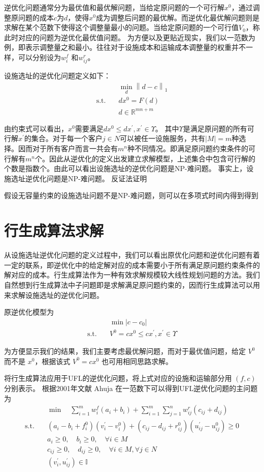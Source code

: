 \documentclass[UTF8]{article}
\begin{document}
逆优化问题通常分为最优值和最优解问题，当给定原问题的一个可行解$x^0$，通过调整原问题的成本$c$为$d$，使得$x^0$成为调整后问题的最优解。而逆优化最优解问题则是求解在某个范数下使得这个调整量最小的问题。当给定原问题的一个可行值$V_0$，称此时对应的问题为逆优化最优值问题。
为方便以及更贴近现实，我们以一范数为例，即表示调整量之和最小。往往对于设施成本和运输成本调整量的权重并不一样，可以分别设为$w_i^f$ 和$w_{ij}^r$。

设施选址的逆优化问题定义如下：
\begin{align*}
&\min_{d} \left\|d-c\right\|_1 \\
\text{s.t.}\quad & dx^0 = F(d) \\
& d \in \mathbb{R}^{mn+m}
\end{align*}

由约束式可以看出，$x^0$需要满足$dx^0 \leq dx^{'}, x^{'} \in \Upsilon$。 其中$\Upsilon$是满足原问题的所有可行解$x^{'}$的集合。对于每一个客户$j \in N$可以被任一设施服务，共有$|M|=m$种选择。因而对于所有客户而言一共会有$m^n$种不同情况。即满足原问题约束条件的可行解有$m^n$个。因此从逆优化的定义出发建立求解模型，上述集合中包含可行解的个数是指数个。由此可以看出设施选址的逆优化问题是NP-难问题。
事实上，设施选址逆优化问题是NP-难问题。
反证法证明

假设无容量约束的设施选址问题不是NP-难问题，则可以在多项式时间内得到得到


\section{行生成算法求解}
从设施选址逆优化问题的定义过程中，我们可以看出原优化问题和逆优化问题有着一定的联系，即逆优化中的给定解对应的成本需要小于所有满足原问题约束条件的解对应的成本。行生成算法作为一种有效求解规模较大线性规划问题的方法。我们自然想到行生成算法中子问题即是求解满足原问题约束的，因而行生成算法可以用来求解设施选址的逆优化问题。

原逆优化模型为
\begin{align*}
&\min |c-c_0|  \\
\text{s.t.}\quad & V^0 = cx^0 \leq cx^{'}, x^{'} \in \Upsilon
\end{align*}


为方便显示我们的结果，我们主要考虑最优解问题，而对于最优值问题，给定 $V^0$ 而不是 $x^0$，根据该式 $V^0 = cx^0$ 也可用相同思路求解。

将行生成算法应用于UFL的逆优化问题，将上式对应的设施和运输部分用 $(f,c)$ 分别表示。
根据2001年文献 Ahuja 在一范数下可以得到UFL逆优化问题的主问题为
\begin{align*}
&\min \quad \sum_{i=1}^m w_i^f(a_i+b_i)+\sum_{i=1}^m\sum_{j=1}^n w_{ij}^r(c_{ij}+d_{ij})\\
\text{s.t.}\quad & (a_i-b_i+f_i^0)(v_i^{'}-v_i^{0}) + (c_{ij}-d_{ij}+r_{ij}^0)(u_{ij}^{'}-u_{ij}^{0})  \geq 0 \\
& a_i \geq 0 ,\quad b_i \geq 0,\quad \forall i \in M \\
& c_{ij} \geq 0, \quad d_{ij} \geq 0, \quad \forall i \in M, \forall j \in N\\
& (v_i^{'},u_{ij}^{'}) \in \mathbb{I}
\end{align*}
\end{document}
